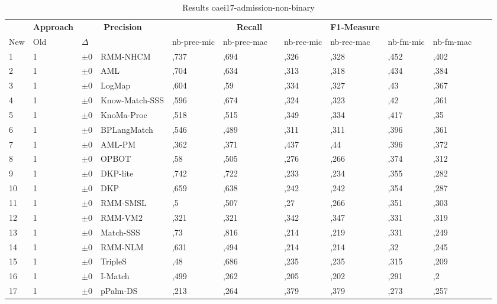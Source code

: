 \begin{table}[htb]
\setlength{\tabcolsep}{0.5em}
\centering
\scriptsize
\begin{tabular}[tb]{lllp{2.3cm}llllllllll}
\noalign{\smallskip}\hline\noalign{\smallskip}
\multicolumn{3}{c}{\textbf{Rank}}& \textbf{Approach}  & \multicolumn{2}{c}{\textbf{Precision}}  & \hspace*{1mm}  & \multicolumn{2}{c}{\textbf{Recall}}  & \hspace*{1mm}  & \multicolumn{2}{c}{\textbf{F1-Measure}}  & \hspace*{1mm} \\
New & Old & $\Delta$ & &nb-prec-mic & nb-prec-mac && nb-rec-mic & nb-rec-mac && nb-fm-mic & nb-fm-mac\\
\noalign{\smallskip}\hline\noalign{\smallskip}
1 & 1 		& $\pm$0 &RMM-NHCM    	&	,737 & ,694 & & ,326 & ,328 & & ,452 & ,402\\
2 & 1 		& $\pm$0 &AML    	&	,704 & ,634 & & ,313 & ,318 & & ,434 & ,384\\
3 & 1 		& $\pm$0 &LogMap    	&	,604 & ,59 & & ,334 & ,327 & & ,43 & ,367\\
4 & 1 		& $\pm$0 &Know-Match-SSS    	&	,596 & ,674 & & ,324 & ,323 & & ,42 & ,361\\
5 & 1 		& $\pm$0 &KnoMa-Proc    	&	,518 & ,515 & & ,349 & ,334 & & ,417 & ,35\\
6 & 1 		& $\pm$0 &BPLangMatch    	&	,546 & ,489 & & ,311 & ,311 & & ,396 & ,361\\
7 & 1 		& $\pm$0 &AML-PM    	&	,362 & ,371 & & ,437 & ,44 & & ,396 & ,372\\
8 & 1 		& $\pm$0 &OPBOT    	&	,58 & ,505 & & ,276 & ,266 & & ,374 & ,312\\
9 & 1 		& $\pm$0 &DKP-lite    	&	,742 & ,722 & & ,233 & ,234 & & ,355 & ,282\\
10 & 1 		& $\pm$0 &DKP    	&	,659 & ,638 & & ,242 & ,242 & & ,354 & ,287\\
11 & 1 		& $\pm$0 &RMM-SMSL    	&	,5 & ,507 & & ,27 & ,266 & & ,351 & ,303\\
12 & 1 		& $\pm$0 &RMM-VM2    	&	,321 & ,321 & & ,342 & ,347 & & ,331 & ,319\\
13 & 1 		& $\pm$0 &Match-SSS    	&	,73 & ,816 & & ,214 & ,219 & & ,331 & ,249\\
14 & 1 		& $\pm$0 &RMM-NLM    	&	,631 & ,494 & & ,214 & ,214 & & ,32 & ,245\\
15 & 1 		& $\pm$0 &TripleS    	&	,48 & ,686 & & ,235 & ,235 & & ,315 & ,209\\
16 & 1 		& $\pm$0 &I-Match    	&	,499 & ,262 & & ,205 & ,202 & & ,291 & ,2\\
17 & 1 		& $\pm$0 &pPalm-DS    	&	,213 & ,264 & & ,379 & ,379 & & ,273 & ,257\\
\end{tabular}
\caption{Results oaei17-admission-non-binary}
\label{tbl:results}
\end{table}